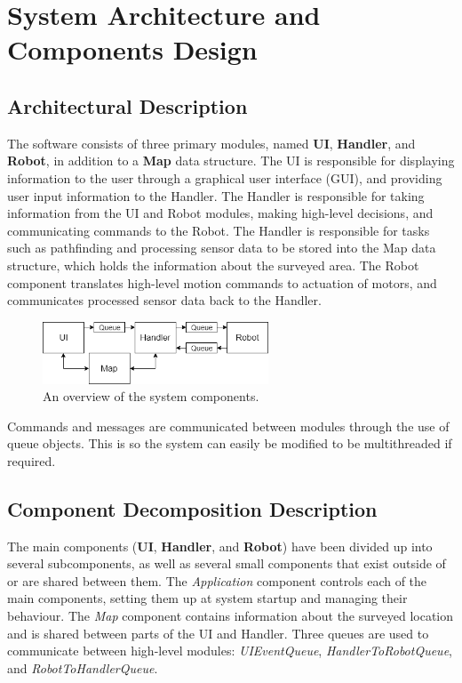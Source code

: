 \documentclass[12pt,a4paper]{article}
\begin{document}
\newpage
\section{System Architecture and Components Design}
\subsection{Architectural Description}
The software consists of three primary modules, named \textbf{UI}, \textbf{Handler}, and \textbf{Robot}, in addition to a \textbf{Map} data structure. The UI is responsible for displaying information to the user through a graphical user interface (GUI), and providing user input information to the Handler. The Handler is responsible for taking information from the UI and Robot modules, making high-level decisions, and communicating commands to the Robot. The Handler is responsible for tasks such as pathfinding and processing sensor data to be stored into the Map data structure, which holds the information about the surveyed area. The Robot component translates high-level motion commands to actuation of motors, and communicates processed sensor data back to the Handler.

\begin{figure}[H]
	\caption{An overview of the system components.}
	\centering
		\includegraphics[width=0.6\textwidth]{SystemBlockDiagram.png}
\end{figure}

Commands and messages are communicated between modules through the use of queue objects. This is so the system can easily be modified to be multithreaded if required.

\subsection{Component Decomposition Description}
	The main components (\textbf{UI}, \textbf{Handler}, and \textbf{Robot}) have been divided up into several subcomponents, as well as several small components that exist outside of or are shared between them. The \textit{Application} component controls each of the main components, setting them up at system startup and managing their behaviour. The \textit{Map} component contains information about the surveyed location and is shared between parts of the UI and Handler. Three queues are used to communicate between high-level modules: \textit{UIEventQueue}, \textit{HandlerToRobotQueue}, and \textit{RobotToHandlerQueue}.
\end{document}
